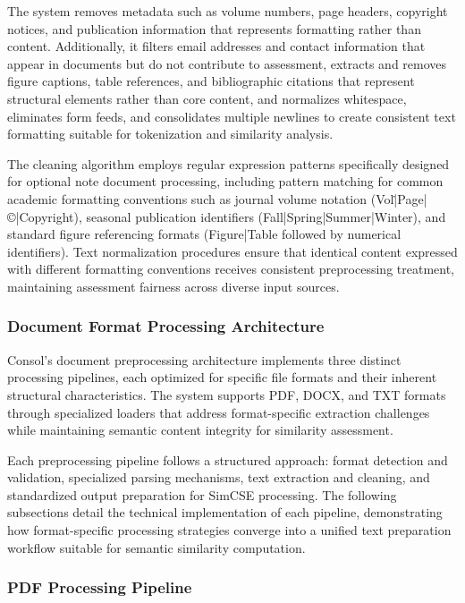 {The system removes metadata such as volume numbers, page headers, copyright notices, and publication information that represents formatting rather than content. Additionally, it filters email addresses and contact information that appear in documents but do not contribute to assessment, extracts and removes figure captions, table references, and bibliographic citations that represent structural elements rather than core content, and normalizes whitespace, eliminates form feeds, and consolidates multiple newlines to create consistent text formatting suitable for tokenization and similarity analysis.

The cleaning algorithm employs regular expression patterns specifically designed for optional note document processing, including pattern matching for common academic formatting conventions such as journal volume notation (Vol\.|Page|©|Copyright), seasonal publication identifiers (Fall|Spring|Summer|Winter), and standard figure referencing formats (Figure|Table followed by numerical identifiers). Text normalization procedures ensure that identical content expressed with different formatting conventions receives consistent preprocessing treatment, maintaining assessment fairness across diverse input sources.

\subsubsection{Document Format Processing Architecture}

Consol's document preprocessing architecture implements three distinct processing pipelines, each optimized for specific file formats and their inherent structural characteristics. The system supports PDF, DOCX, and TXT formats through specialized loaders that address format-specific extraction challenges while maintaining semantic content integrity for similarity assessment.

Each preprocessing pipeline follows a structured approach: format detection and validation, specialized parsing mechanisms, text extraction and cleaning, and standardized output preparation for SimCSE processing. The following subsections detail the technical implementation of each pipeline, demonstrating how format-specific processing strategies converge into a unified text preparation workflow suitable for semantic similarity computation.


\subsubsection{PDF Processing Pipeline}
\label{subsubsec:pdf_pipeline}

}
